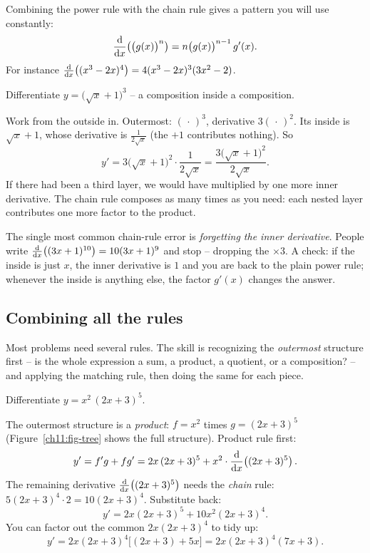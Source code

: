 \begin{example}\label{ch11:ex-chain-genpow}
Combining the power rule with the chain rule gives a pattern you will use constantly:
\[
  \frac{\mathrm{d}}{\mathrm{d} x}\!\left(\big(g(x)\big)^n\right) = n\big(g(x)\big)^{n-1}\,g'(x).
\]
For instance $\frac{\mathrm{d}}{\mathrm{d} x}\!\left((x^3 - 2x)^4\right) = 4(x^3-2x)^3(3x^2-2)$.
\end{example}

\begin{example}\label{ch11:ex-chain3}
Differentiate $y = \big(\sqrt{x}+1\big)^{3}$ -- a composition inside a composition.

Work from the outside in. Outermost: $(\,\cdot\,)^3$, derivative $3(\,\cdot\,)^2$. Its inside
is $\sqrt{x}+1$, whose derivative is $\tfrac{1}{2\sqrt{x}}$ (the $+1$ contributes nothing).
So
\[
  y' = 3\big(\sqrt{x}+1\big)^{2}\cdot\frac{1}{2\sqrt{x}}
     = \frac{3\big(\sqrt{x}+1\big)^{2}}{2\sqrt{x}} .
\]
If there had been a third layer, we would have multiplied by one more inner
derivative. The chain rule composes as many times as you need: each nested layer
contributes one more factor to the product.
\end{example}

\begin{trapbox}
The single most common chain-rule error is \emph{forgetting the inner derivative}. People
write $\frac{\mathrm{d}}{\mathrm{d} x}\!\left((3x+1)^{10}\right) = 10(3x+1)^9$ and stop -- dropping the $\times 3$. A
check: if the inside is just $x$, the inner derivative is $1$ and you are back to the
plain power rule; whenever the inside is anything else, the factor $g'(x)$ changes the
answer.
\end{trapbox}

\subsection{Combining all the rules}

Most problems need several rules. The skill is recognizing the \emph{outermost}
structure first -- is the whole expression a sum, a product, a quotient, or a composition?
-- and applying the matching rule, then doing the same for each piece.

\begin{example}\label{ch11:ex-combo1}
Differentiate $y = x^2\,(2x+3)^5$.

The outermost structure is a \emph{product}: $f = x^2$ times $g = (2x+3)^5$
(Figure~\ref{ch11:fig-tree} shows the full structure). Product rule
first:
\[
  y' = f'g + fg' = 2x\,(2x+3)^5 + x^2\cdot\frac{\mathrm{d}}{\mathrm{d} x}\!\left((2x+3)^5\right).
\]
The remaining derivative $\frac{\mathrm{d}}{\mathrm{d} x}\!\left((2x+3)^5\right)$ needs the \emph{chain} rule:
$5(2x+3)^4\cdot 2 = 10(2x+3)^4$. Substitute back:
\[
  y' = 2x(2x+3)^5 + 10x^2(2x+3)^4 .
\]
You can factor out the common $2x(2x+3)^4$ to tidy up:
\[
  y' = 2x(2x+3)^4\big[(2x+3) + 5x\big] = 2x(2x+3)^4(7x+3).
\]
\end{example}

